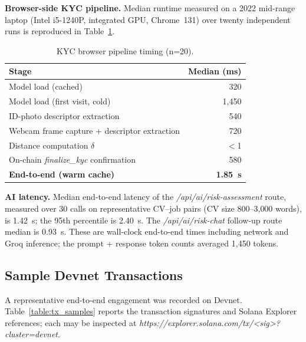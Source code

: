 \textbf{Browser-side KYC pipeline.} Median runtime measured on a 2022 mid-range laptop (Intel i5-1240P, integrated GPU, Chrome~131) over twenty independent runs is reproduced in Table~\ref{table:kyc_perf}.

\begin{table}[H]
\centering
\caption{KYC browser pipeline timing (n=20).}
\label{table:kyc_perf}
\small
\begin{tabular}{|l|r|}
\hline
\textbf{Stage} & \textbf{Median (ms)} \\ \hline
Model load (cached) & 320 \\ \hline
Model load (first visit, cold) & 1{,}450 \\ \hline
ID-photo descriptor extraction & 540 \\ \hline
Webcam frame capture + descriptor extraction & 720 \\ \hline
Distance computation $\delta$ & $<$1 \\ \hline
On-chain \emph{finalize\_kyc} confirmation & 580 \\ \hline
\textbf{End-to-end (warm cache)} & \textbf{1.85~s} \\ \hline
\end{tabular}
\end{table}

\textbf{AI latency.} Median end-to-end latency of the \emph{/api/ai/risk-assessment} route, measured over 30 calls on representative CV--job pairs (CV size 800--3{,}000 words), is 1.42~s; the 95th percentile is 2.40~s. The \emph{/api/ai/risk-chat} follow-up route median is 0.93~s. These are wall-clock end-to-end times including network and Groq inference; the prompt + response token counts averaged 1{,}450 tokens.

\subsection{Sample Devnet Transactions}
\label{subsection:4.3.2}

A representative end-to-end engagement was recorded on Devnet. Table~\ref{table:tx_samples} reports the transaction signatures and Solana Explorer references; each may be inspected at \emph{https://explorer.solana.com/tx/\textless{}sig\textgreater{}?cluster=devnet}.


